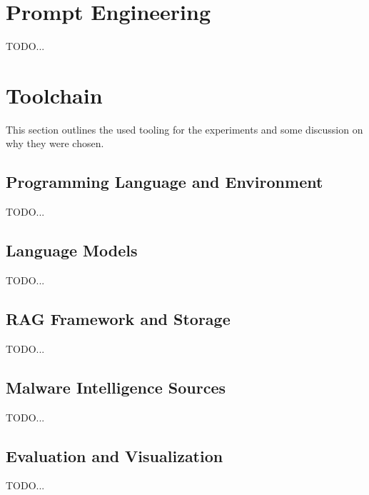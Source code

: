 \section{Prompt Engineering}
TODO...

\section{Toolchain}
This section outlines the used tooling for the experiments and some discussion on why they were
chosen.

\subsection{Programming Language and Environment}
TODO...

\subsection{Language Models}
TODO...

\subsection{RAG Framework and Storage}
TODO...

\subsection{Malware Intelligence Sources}
TODO...

\subsection{Evaluation and Visualization}
TODO...


